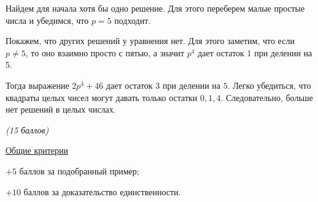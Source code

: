 \solutionSection

Найдем для начала хотя бы одно решение. Для этого переберем малые простые числа и убедимся, что $p = 5$ подходит.
	
Покажем, что других решений у уравнения нет. Для этого заметим, что если $p \neq 5$, то оно взаимно просто с пятью, а значит $p^4$ дает остаток 1 при делении на 5.

Тогда выражение $2p^4 + 46$ дает остаток $3$ при делении на $5$. Легко убедиться, что квадраты целых чисел могут давать только остатки $0, 1, 4$. Следовательно, больше нет решений в целых числах.


\additionalCriteria

\textit{(15 баллов)}

	\underline{Общие критерии}

	$+5$ баллов за подобранный пример;
	
	$+10$ баллов за доказательство единственности.

	
